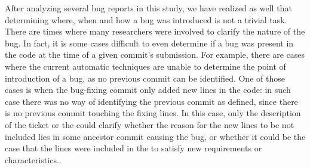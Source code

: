 \documentclass[a4paper, 12pt]{book}
\begin{document}
After analyzing several bug reports in this study, we have realized as well that determining where, when and how a bug was introduced is not a trivial task. There are times where many researchers were involved to clarify the nature of the bug. In fact, it is some cases difficult to even determine if a bug was present in the code at the time of a given commit's submission. For example, there are cases where the current automatic techniques are unable to determine the point of introduction of a bug, as no previous commit can be identified. One of those cases is when the bug-fixing commit only added new lines in the code: in such case there was no way of identifying the previous commit as defined, since there is no previous commit touching the fixing lines. In this case, only the description of the ticket or the \BFC could clarify whether the reason for the new lines to be not included lies in some ancestor commit causing the bug, or whether it could be the case that the lines were included in the \BFC to satisfy new requirements or characteristics.. 
\end{document}
